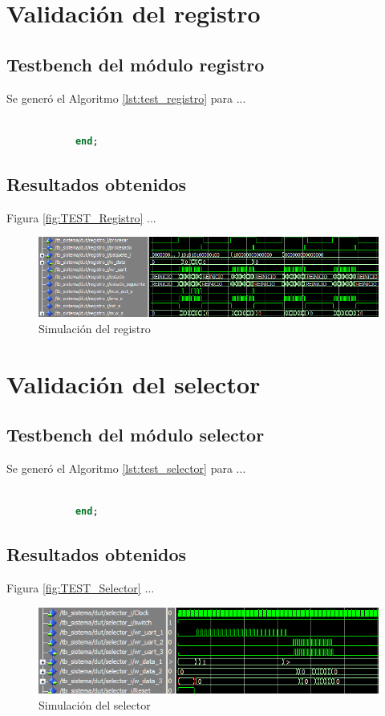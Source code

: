 \section{Validación del registro}

	\subsection{Testbench del módulo registro}
			
		Se generó el Algoritmo \ref{lst:test_registro} para ...
		
			
		\begin{lstlisting}[language = vhdl,caption=Testbench del módulo registro,label={lst:test_registro}] 
				
			end;
		\end{lstlisting}
			
	\subsection{Resultados obtenidos}
				
		Figura \ref{fig:TEST_Registro} ...
		
	\begin{figure}[h]
	\centering
	\includegraphics[scale=0.7]{./Figures/Test/Registro}
		\caption{Simulación del registro}
		\label{fig:Test_Registro}
	\end{figure}
	
\section{Validación del selector}

	\subsection{Testbench del módulo selector}
			
		Se generó el Algoritmo \ref{lst:test_selector} para ...
		
			
		\begin{lstlisting}[language = vhdl,caption=Testbench del módulo selector,label={lst:test_selector}] 
				
			end;
		\end{lstlisting}
			
	\subsection{Resultados obtenidos}
				
		Figura \ref{fig:TEST_Selector} ...
		
	\begin{figure}[h]
	\centering
	\includegraphics[scale=0.95]{./Figures/Test/Selector}
		\caption{Simulación del selector}
		\label{fig:Test_Selector}
	\end{figure}
			